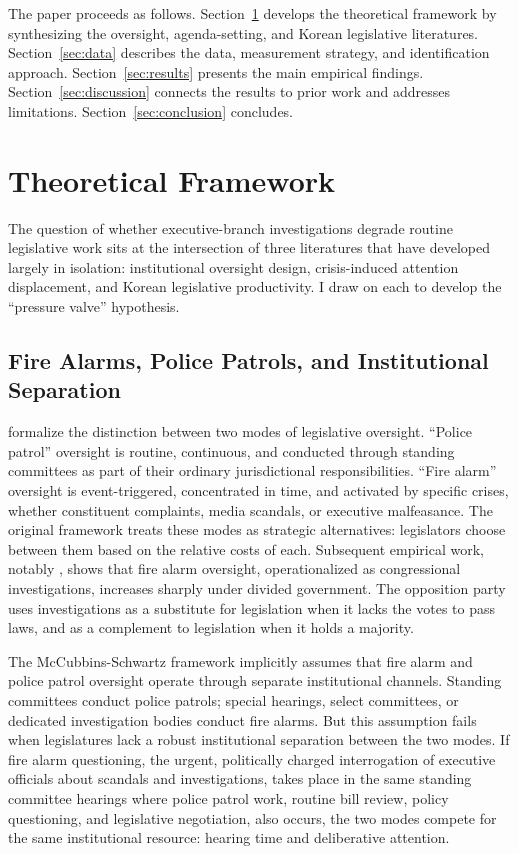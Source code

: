 \documentclass[11pt]{article}
\begin{document}
The paper proceeds as follows. Section~\ref{sec:lit} develops the theoretical framework by synthesizing the oversight, agenda-setting, and Korean legislative literatures. Section~\ref{sec:data} describes the data, measurement strategy, and identification approach. Section~\ref{sec:results} presents the main empirical findings. Section~\ref{sec:discussion} connects the results to prior work and addresses limitations. Section~\ref{sec:conclusion} concludes.


\section{Theoretical Framework}
\label{sec:lit}

The question of whether executive-branch investigations degrade routine legislative work sits at the intersection of three literatures that have developed largely in isolation: institutional oversight design, crisis-induced attention displacement, and Korean legislative productivity. I draw on each to develop the ``pressure valve'' hypothesis.

\subsection{Fire Alarms, Police Patrols, and Institutional Separation}

\citet{mccubbins1989} formalize the distinction between two modes of legislative oversight. ``Police patrol'' oversight is routine, continuous, and conducted through standing committees as part of their ordinary jurisdictional responsibilities. ``Fire alarm'' oversight is event-triggered, concentrated in time, and activated by specific crises, whether constituent complaints, media scandals, or executive malfeasance. The original framework treats these modes as strategic alternatives: legislators choose between them based on the relative costs of each. Subsequent empirical work, notably \citet{kriner2008}, shows that fire alarm oversight, operationalized as congressional investigations, increases sharply under divided government. The opposition party uses investigations as a substitute for legislation when it lacks the votes to pass laws, and as a complement to legislation when it holds a majority.

The McCubbins-Schwartz framework implicitly assumes that fire alarm and police patrol oversight operate through separate institutional channels. Standing committees conduct police patrols; special hearings, select committees, or dedicated investigation bodies conduct fire alarms. But this assumption fails when legislatures lack a robust institutional separation between the two modes. If fire alarm questioning, the urgent, politically charged interrogation of executive officials about scandals and investigations, takes place in the same standing committee hearings where police patrol work, routine bill review, policy questioning, and legislative negotiation, also occurs, the two modes compete for the same institutional resource: hearing time and deliberative attention.
\end{document}
